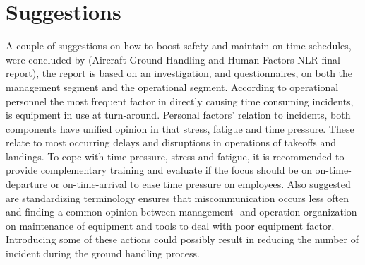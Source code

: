 \section{Suggestions}
    A couple of suggestions on how to boost safety and maintain on-time schedules, were concluded by (Aircraft-Ground-Handling-and-Human-Factors-NLR-final-report), the report is based on an investigation, and questionnaires, on both the management segment and the operational segment. According to operational personnel the most frequent factor in directly causing time consuming incidents, is equipment in use at turn-around. Personal factors' relation to incidents, both components have unified opinion in that stress, fatigue and time pressure. These relate to most occurring delays and disruptions in operations of takeoffs and landings. To cope with time pressure, stress and fatigue, it is recommended to provide complementary training and evaluate if the focus should be on on-time-departure or on-time-arrival to ease time pressure on employees. Also suggested are standardizing terminology ensures that miscommunication occurs less often and finding a common opinion between management- and operation-organization on maintenance of equipment and tools to deal with poor equipment factor. Introducing some of these actions could possibly result in reducing the number of incident during the ground handling process.